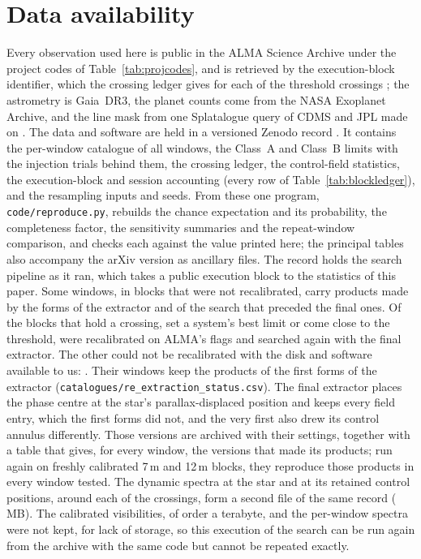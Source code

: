 \section*{Data availability}
\label{sec:data}
Every observation used here is public in the ALMA Science Archive under the
\NProjCodes{} project codes of Table~\ref{tab:projcodes}, and is retrieved by
the execution-block identifier, which the crossing ledger gives for each of the
\EvNCrossRaw{} threshold crossings \citep{Chen2022}; the astrometry is
Gaia~DR3, the planet counts come from the NASA Exoplanet Archive, and the line
mask from one Splatalogue query of CDMS and JPL made on \McQueryDate. The data
and software are held in a versioned Zenodo record \citep{SIdeposit}. It
contains the per-window catalogue of all \NWindows{} windows, the Class~A and
Class~B limits with the injection trials behind them, the crossing ledger, the
control-field statistics, the execution-block and session accounting (every
row of Table~\ref{tab:blockledger}), and the
resampling inputs and seeds. From these one program,
\texttt{code/reproduce.py}, rebuilds the chance expectation and its
probability, the completeness factor, the sensitivity summaries and the
repeat-window comparison, and checks each against the value printed here; the
principal tables also accompany the arXiv version as ancillary files. The
record holds the search pipeline as it ran, which takes a public execution
block to the statistics of this paper. Some windows, in blocks that were not
recalibrated, carry products made by the forms of the extractor and of the
search that preceded the final ones. Of the \XgNBlkPlan{} blocks that hold a
crossing, set a system's best limit or come close to the threshold,
\XgNBlkReDone{} were recalibrated on ALMA's flags and searched again with the
final extractor. The other \XgNBlkNotRe{} could not be recalibrated with the
disk and software available to us: \XgNotReClause. Their windows keep the
products of the first forms of the extractor
(\texttt{catalogues/\allowbreak re\_extraction\_status.csv}). The final extractor places the phase
centre at the star's parallax-displaced position and keeps every field entry,
which the first forms did not, and the very first also drew its control
annulus differently. Those versions are archived with their settings,
together with a table that gives, for every window, the versions that made
its products; run again on freshly calibrated 7\,m and 12\,m blocks, they
reproduce those products in every window tested. The dynamic spectra at the
star and at its \RcNRetCtrl{} retained control positions, around each of the
\DaNSpecCross{} crossings, form a second file of the same record
(\DaSpecFileMB\,MB). The calibrated visibilities, of order a terabyte, and the
per-window spectra were not kept, for lack of storage, so this execution of
the search can be run again from the archive with the same code but cannot be
repeated exactly.
